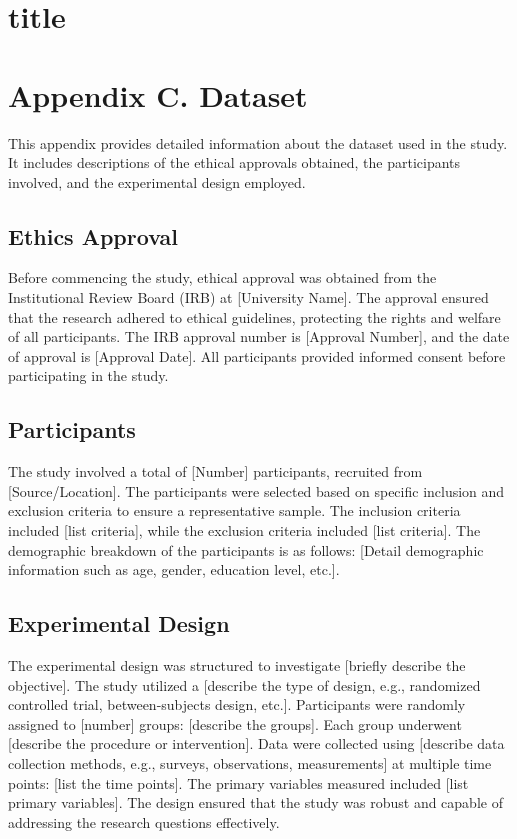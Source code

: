 \renewcommand\listtablename{\normalsize\normalfont\centering\vspace*{-0.5 in} APPENDICES}
\iftablespage
{}
{}
\section{title}




\section{Appendix C. Dataset}
This appendix provides detailed information about the dataset used in the study. It includes descriptions of the ethical approvals obtained, the participants involved, and the experimental design employed.

\subsection{Ethics Approval}
Before commencing the study, ethical approval was obtained from the Institutional Review Board (IRB) at [University Name]. The approval ensured that the research adhered to ethical guidelines, protecting the rights and welfare of all participants. The IRB approval number is [Approval Number], and the date of approval is [Approval Date]. All participants provided informed consent before participating in the study.

\subsection{Participants}
The study involved a total of [Number] participants, recruited from [Source/Location]. The participants were selected based on specific inclusion and exclusion criteria to ensure a representative sample. The inclusion criteria included [list criteria], while the exclusion criteria included [list criteria]. The demographic breakdown of the participants is as follows: [Detail demographic information such as age, gender, education level, etc.].

\subsection{Experimental Design}
The experimental design was structured to investigate [briefly describe the objective]. The study utilized a [describe the type of design, e.g., randomized controlled trial, between-subjects design, etc.]. Participants were randomly assigned to [number] groups: [describe the groups]. Each group underwent [describe the procedure or intervention]. Data were collected using [describe data collection methods, e.g., surveys, observations, measurements] at multiple time points: [list the time points]. The primary variables measured included [list primary variables]. The design ensured that the study was robust and capable of addressing the research questions effectively.


\clearpage




